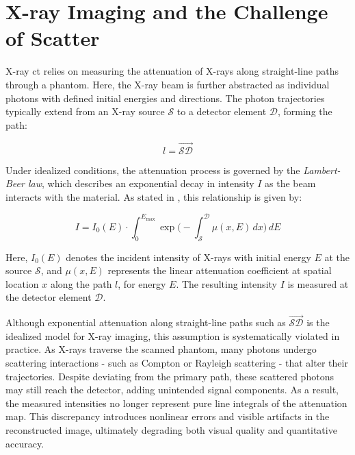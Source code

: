 \section{X-ray Imaging and the Challenge of Scatter}

X-ray \ac{ct} relies on measuring the attenuation of X-rays along straight-line
paths through a phantom. Here, the X-ray beam is further abstracted as
individual photons with defined initial energies and directions. The photon
trajectories typically extend from an X-ray source $\mathcal{S}$ to a detector
element $\mathcal{D}$, forming the path:

$$l = \overrightarrow{\mathcal{S}\mathcal{D}}$$

Under idealized conditions, the attenuation process is governed by the
\emph{Lambert-Beer law}, which describes an exponential decay in intensity $I$
as the beam interacts with the material. As stated in
\cite[Chap.~7]{medicalImagingSystemsIntro2019:}, this relationship is given by:

\begin{equation}
    \label{eq:lambert_beer_law}
     I = I_0(E)\cdot \int_0^{E_\text{max}} \exp\bigg(-\int_{{\mathcal{S}}}^{\mathcal{D}} \mu(x,E) \, dx\bigg) \, dE
\end{equation}

Here, $I_0(E)$ denotes the incident intensity of X-rays with initial energy $E$
at the source $\mathcal{S}$, and $\mu(x,E)$ represents the linear attenuation
coefficient at spatial location $x$ along the path $l$, for energy $E$. The
resulting intensity $I$ is measured at the detector element $\mathcal{D}$.

Although exponential attenuation along straight-line paths such as
$\overrightarrow{\mathcal{S}\mathcal{D}}$ is the idealized model for X-ray
imaging, this assumption is systematically violated in practice. As X-rays
traverse the scanned phantom, many photons undergo scattering interactions -
such as Compton or Rayleigh scattering - that alter their trajectories. Despite
deviating from the primary path, these scattered photons may still reach the
detector, adding unintended signal components. As a result, the measured
intensities no longer represent pure line integrals of the attenuation map. This
discrepancy introduces nonlinear errors and visible artifacts in the
reconstructed image, ultimately degrading both visual quality and quantitative
accuracy.

